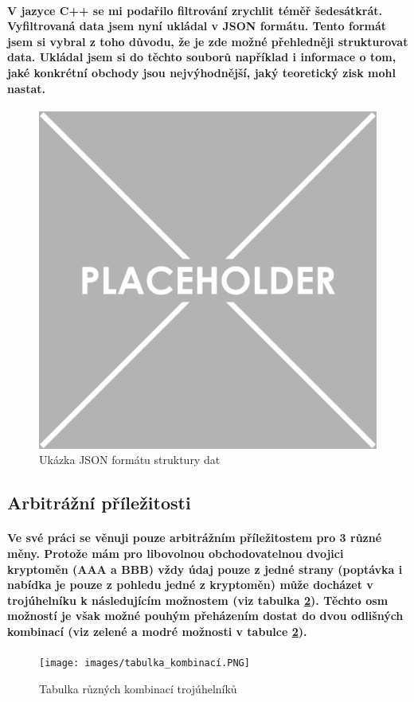 \documentclass[thesis=B,czech]{FITthesis}[2019/03/21]
\begin{document}
\paragraph{
V jazyce C++ se mi podařilo filtrování zrychlit téměř šedesátkrát. Vyfiltrovaná data jsem nyní ukládal v JSON formátu. Tento formát jsem si vybral z toho důvodu, že je zde možné přehledněji strukturovat data. Ukládal jsem si do těchto souborů například i informace o tom, jaké konkrétní obchody jsou nejvýhodnější, jaký teoretický zisk mohl nastat. 
}
\begin{figure}\centering
	\includegraphics[width=1\textwidth]{images/placeholder.png}
	\caption{Ukázka JSON formátu struktury dat}\label{fig:pokus}
\end{figure}
\subsection{Arbitrážní příležitosti}
\paragraph{
Ve své práci se věnuji pouze arbitrážním příležitostem pro 3 různé měny. Protože mám pro libovolnou obchodovatelnou dvojici kryptoměn (AAA a BBB) vždy údaj pouze z jedné strany (poptávka i nabídka je pouze z pohledu jedné z kryptoměn) může docházet v trojúhelníku k následujícím možnostem (viz tabulka \ref{tabulka_kombinaci}). Těchto osm možností je však možné pouhým přeházením dostat do dvou odlišných kombinací (viz zelené a modré možnosti v tabulce \ref{tabulka_kombinaci}).
}
\begin{figure}\centering
	\texttt{[image: images/tabulka\_kombinací.PNG]}
	\caption{Tabulka různých kombinací trojúhelníků}\label{tabulka_kombinaci}
\end{figure}
\end{document}
